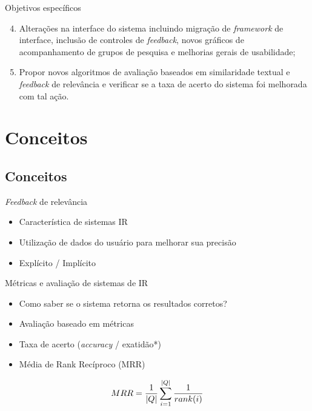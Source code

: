 \documentclass{beamer}
\begin{document}
\begin{frame}{Objetivos específicos}
  \begin{enumerate}[<+->]
    \setcounter{enumi}{3}

    \item Alterações na interface do sistema incluindo migração de \textit{framework} de interface, inclusão de controles de \textit{feedback}, novos gráficos de acompanhamento de grupos de pesquisa e melhorias gerais de usabilidade;

    \item Propor novos algoritmos de avaliação baseados em similaridade textual e \textit{feedback} de relevância e verificar se a taxa de acerto do sistema foi melhorada com tal ação.
  \end{enumerate}
\end{frame}

\section{Conceitos}
\subsection*{Conceitos}

\begin{frame}{\textit{Feedback} de relevância}
  \begin{itemize}
    \item Característica de sistemas IR
    \item Utilização de dados do usuário para melhorar sua precisão
    \item Explícito / Implícito
  \end{itemize}
\end{frame}

\begin{frame}{Métricas e avaliação de sistemas de IR}
  \begin{itemize}
    \item Como saber se o sistema retorna os resultados corretos?
    \item Avaliação baseado em métricas
    \item Taxa de acerto (\textit{accuracy} / exatidão*)
    \item Média de Rank Recíproco (MRR)
  \end{itemize}

  $$
  MRR = {1 \over |Q|} \sum_{i=1}^{|Q|} {1 \over rank(i)}
  $$
\end{frame}
\end{document}
